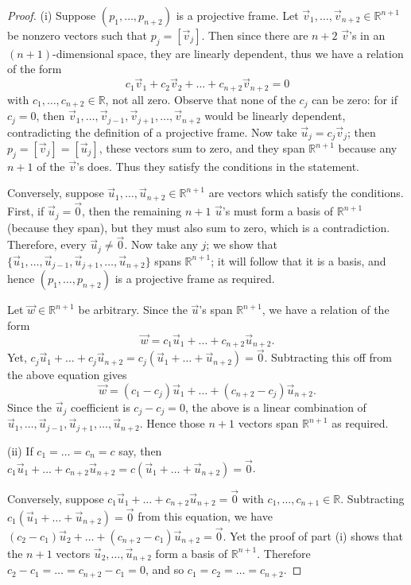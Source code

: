 \documentclass[leqno]{book}
\begin{document}
\begin{proof}
(i) Suppose $(p_1,\dots,p_{n+2})$ is a projective frame.  Let $\vec v_1,\dots,\vec v_{n+2}\in\mathbb R^{n+1}$ be nonzero vectors such that $p_j=[\vec v_j]$.  Then since there are $n+2$ $\vec v$'s in an $(n+1)$-dimensional space, they are linearly dependent, thus we have a relation of the form
$$c_1\vec v_1+c_2\vec v_2+\dots+c_{n+2}\vec v_{n+2}=0$$
with $c_1,\dots,c_{n+2}\in\mathbb R$, not all zero.  Observe that none of the $c_j$ can be zero: for if $c_j=0$, then $\vec v_1,\dots,\vec v_{j-1},\vec v_{j+1},\dots,\vec v_{n+2}$ would be linearly dependent, contradicting the definition of a projective frame.  Now take $\vec u_j=c_j\vec v_j$; then $p_j=[\vec v_j]=[\vec u_j]$, these vectors sum to zero, and they span $\mathbb R^{n+1}$ because any $n+1$ of the $\vec v$'s does.  Thus they satisfy the conditions in the statement.

Conversely, suppose $\vec u_1,\dots,\vec u_{n+2}\in\mathbb R^{n+1}$ are vectors which satisfy the conditions.  First, if $\vec u_j=\vec 0$, then the remaining $n+1$ $\vec u$'s must form a basis of $\mathbb R^{n+1}$ (because they span), but they must also sum to zero, which is a contradiction.  Therefore, every $\vec u_j\ne\vec 0$.  Now take any $j$; we show that $\{\vec u_1,\dots,\vec u_{j-1},\vec u_{j+1},\dots,\vec u_{n+2}\}$ spans $\mathbb R^{n+1}$; it will follow that it is a basis, and hence $(p_1,\dots,p_{n+2})$ is a projective frame as required.

Let $\vec w\in\mathbb R^{n+1}$ be arbitrary.  Since the $\vec u$'s span $\mathbb R^{n+1}$, we have a relation of the form
$$\vec w=c_1\vec u_1+\dots+c_{n+2}\vec u_{n+2}.$$
Yet, $c_j\vec u_1+\dots+c_j\vec u_{n+2}=c_j(\vec u_1+\dots+\vec u_{n+2})=\vec 0$.  Subtracting this off from the above equation gives
$$\vec w=(c_1-c_j)\vec u_1+\dots+(c_{n+2}-c_j)\vec u_{n+2}.$$
Since the $\vec u_j$ coefficient is $c_j-c_j=0$, the above is a linear combination of $\vec u_1,\dots,\vec u_{j-1},\vec u_{j+1},\dots,\vec u_{n+2}$.  Hence those $n+1$ vectors span $\mathbb R^{n+1}$ as required.

(ii) If $c_1=\dots=c_n=c$ say, then $c_1\vec u_1+\dots+c_{n+2}\vec u_{n+2}=c(\vec u_1+\dots+\vec u_{n+2})=\vec 0$.

Conversely, suppose $c_1\vec u_1+\dots+c_{n+2}\vec u_{n+2}=\vec 0$ with $c_1,\dots,c_{n+1}\in\mathbb R$.  Subtracting $c_1(\vec u_1+\dots+\vec u_{n+2})=\vec 0$ from this equation, we have $(c_2-c_1)\vec u_2+\dots+(c_{n+2}-c_1)\vec u_{n+2}=\vec 0$.  Yet the proof of part (i) shows that the $n+1$ vectors $\vec u_2,\dots,\vec u_{n+2}$ form a basis of $\mathbb R^{n+1}$.  Therefore $c_2-c_1=\dots=c_{n+2}-c_1=0$, and so $c_1=c_2=\dots=c_{n+2}$.


\end{proof}
\end{document}
